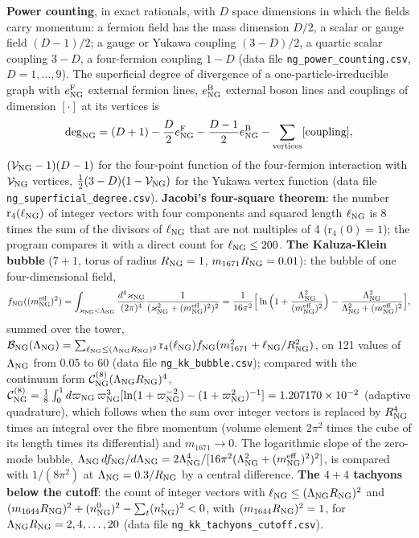 \documentclass[
  10pt,
]{article}
\begin{document}
\textbf{Power counting}, in exact rationals, with \(D\) space dimensions
in which the fields carry momentum: a fermion field has the mass
dimension \(D/2\), a scalar or gauge field \((D-1)/2\); a gauge or
Yukawa coupling \((3-D)/2\), a quartic scalar coupling \(3-D\), a
four-fermion coupling \(1-D\) (data file
\texttt{ng\_power\_counting.csv}, \(D=1,\dots,9\)). The superficial
degree of divergence of a one-particle-irreducible graph with
\(e^{\rm F}_{\rm NG}\) external fermion lines, \(e^{\rm B}_{\rm NG}\)
external boson lines and couplings of dimension \([\cdot]\) at its
vertices is
\[\deg_{\rm NG}=(D+1)-\frac D2e^{\rm F}_{\rm NG}-\frac{D-1}2e^{\rm B}_{\rm NG}-\sum_{\rm vertices}[\text{coupling}],\]
\((\mathcal V_{\rm NG}-1)(D-1)\) for the four-point function of the
four-fermion interaction with \(\mathcal V_{\rm NG}\) vertices,
\(\tfrac12(3-D)(1-\mathcal V_{\rm NG})\) for the Yukawa vertex function
(data file \texttt{ng\_superficial\_degree.csv}). \textbf{Jacobi's
four-square theorem}: the number \(\mathrm r_4(\ell_{\rm NG})\) of
integer vectors with four components and squared length
\(\ell_{\rm NG}\) is 8 times the sum of the divisors of
\(\ell_{\rm NG}\) that are not multiples of 4 (\(\mathrm r_4(0)=1\));
the program compares it with a direct count for \(\ell_{\rm NG}\le200\).
\textbf{The Kaluza-Klein bubble} (\(7+1\), torus of radius
\(R_{\rm NG}=1\), \(m_{1671}R_{\rm NG}=0.01\)): the bubble of one
four-dimensional field,
\[f_{\rm NG}((m^{\rm eff}_{\rm NG})^2)=\int_{\varkappa_{\rm NG}<\Lambda_{\rm NG}}\frac{d^4\varkappa_{\rm NG}}{(2\pi)^4}\frac1{(\varkappa^2_{\rm NG}+(m^{\rm eff}_{\rm NG})^2)^2}=\frac1{16\pi^2}\Big[\ln\Big(1+\frac{\Lambda_{\rm NG}^2}{(m^{\rm eff}_{\rm NG})^2}\Big)-\frac{\Lambda_{\rm NG}^2}{\Lambda_{\rm NG}^2+(m^{\rm eff}_{\rm NG})^2}\Big],\]
summed over the tower,
\(\mathcal B_{\rm NG}(\Lambda_{\rm NG})=\sum_{\ell_{\rm NG}\le(\Lambda_{\rm NG}R_{\rm NG})^2}\mathrm r_4(\ell_{\rm NG})f_{\rm NG}(m_{1671}^2+\ell_{\rm NG}/R_{\rm NG}^2)\),
on 121 values of \(\Lambda_{\rm NG}\) from 0.05 to 60 (data file
\texttt{ng\_kk\_bubble.csv}); compared with the continuum form
\(\mathcal C^{(8)}_{\rm NG}(\Lambda_{\rm NG}R_{\rm NG})^4\),
\(\mathcal C^{(8)}_{\rm NG}=\tfrac18\int_0^1d\varpi_{\rm NG}\,\varpi_{\rm NG}^3[\ln(1+\varpi_{\rm NG}^{-2})-(1+\varpi_{\rm NG}^2)^{-1}]=1.207170\times10^{-2}\)
(adaptive quadrature), which follows when the sum over integer vectors
is replaced by \(R^4_{\rm NG}\) times an integral over the fibre
momentum (volume element \(2\pi^2\) times the cube of its length times
its differential) and \(m_{1671}\to0\). The logarithmic slope of the
zero-mode bubble,
\(\Lambda_{\rm NG}\,df_{\rm NG}/d\Lambda_{\rm NG}=2\Lambda_{\rm NG}^4/[16\pi^2(\Lambda_{\rm NG}^2+(m^{\rm eff}_{\rm NG})^2)^2]\),
is compared with \(1/(8\pi^2)\) at \(\Lambda_{\rm NG}=0.3/R_{\rm NG}\)
by a central difference. \textbf{The \(4+4\) tachyons below the cutoff}:
the count of integer vectors with
\(\ell_{\rm NG}\le(\Lambda_{\rm NG}R_{\rm NG})^2\) and
\((m_{1644}R_{\rm NG})^2+(n^0_{\rm NG})^2-\sum_t(n^t_{\rm NG})^2<0\),
with \((m_{1644}R_{\rm NG})^2=1\), for
\(\Lambda_{\rm NG}R_{\rm NG}=2,4,\dots,20\) (data file
\texttt{ng\_kk\_tachyons\_cutoff.csv}).
\end{document}
